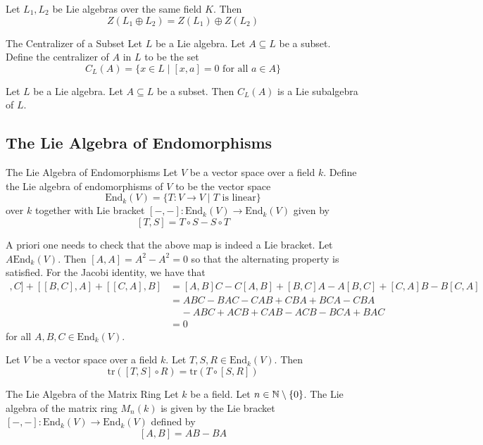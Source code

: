 \documentclass[a4paper]{article}
\begin{document}
\begin{prp}{}{} Let $L_1,L_2$ be Lie algebras over the same field $K$. Then $$Z(L_1\oplus L_2)=Z(L_1)\oplus Z(L_2)$$
\end{prp}

\begin{defn}{The Centralizer of a Subset}{} Let $L$ be a Lie algebra. Let $A\subseteq L$ be a subset. Define the centralizer of $A$ in $L$ to be the set $$C_L(A)=\{x\in L\;|\;[x,a]=0\text{ for all }a\in A\}$$
\end{defn}

\begin{lmm}{}{} Let $L$ be a Lie algebra. Let $A\subseteq L$ be a subset. Then $C_L(A)$ is a Lie subalgebra of $L$. 
\end{lmm}
\subsection{The Lie Algebra of Endomorphisms}
\begin{defn}{The Lie Algebra of Endomorphisms}{} Let $V$ be a vector space over a field $k$. Define the Lie algebra of endomorphisms of $V$ to be the vector space $$\text{End}_k(V)=\{T:V\to V\;|\;T\text{ is linear}\}$$ over $k$ together with Lie bracket $[-,-]:\text{End}_k(V)\to\text{End}_k(V)$ given by $$[T,S]=T\circ S-S\circ T$$
\end{defn}

A priori one needs to check that the above map is indeed a Lie bracket. Let $A\text{End}_k(V)$. Then $[A,A]=A^2-A^2=0$ so that the alternating property is satisfied. For the Jacobi identity, we have that 
\begin{align*}
[[A,B],C]+[[B,C],A]+[[C,A],B]&=[A,B]C-C[A,B]+[B,C]A-A[B,C]+[C,A]B-B[C,A]\\
&=ABC-BAC-CAB+CBA+BCA-CBA\\
&\;\;\;\;-ABC+ACB+CAB-ACB-BCA+BAC\\
&=0
\end{align*}
for all $A,B,C\in\text{End}_k(V)$. 

\begin{lmm}{}{} Let $V$ be a vector space over a field $k$. Let $T,S,R\in\text{End}_k(V)$. Then $$\text{tr}([T,S]\circ R)=\text{tr}(T\circ [S,R])$$
\end{lmm}

\begin{defn}{The Lie Algebra of the Matrix Ring}{} Let $k$ be a field. Let $n\in\mathbb{N}\setminus\{0\}$. The Lie algebra of the matrix ring $M_n(k)$ is given by the Lie bracket $[-,-]:\text{End}_k(V)\to\text{End}_k(V)$ defined by $$[A,B]=AB-BA$$
\end{defn}
\end{document}
